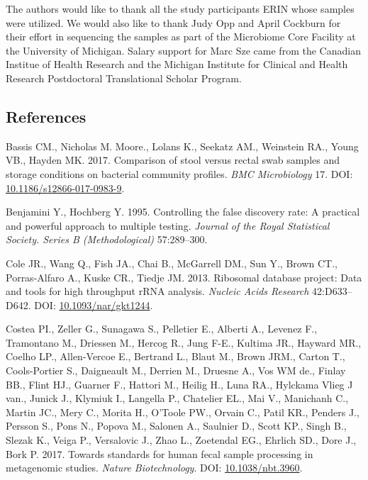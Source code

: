 \documentclass[12pt,]{article}
\begin{document}
The authors would like to thank all the study participants ERIN whose
samples were utilized. We would also like to thank Judy Opp and April
Cockburn for their effort in sequencing the samples as part of the
Microbiome Core Facility at the University of Michigan. Salary support
for Marc Sze came from the Canadian Institue of Health Research and the
Michigan Institute for Clinical and Health Research Postdoctoral
Translational Scholar Program.

\newpage

\subsection{References}\label{references}

\hypertarget{refs}{}
\hypertarget{ref-storage_Bassis_2017}{}
Bassis CM., Nicholas M. Moore., Lolans K., Seekatz AM., Weinstein RA.,
Young VB., Hayden MK. 2017. Comparison of stool versus rectal swab
samples and storage conditions on bacterial community profiles.
\emph{BMC Microbiology} 17. DOI:
\href{https://doi.org/10.1186/s12866-017-0983-9}{10.1186/s12866-017-0983-9}.

\hypertarget{ref-benjamini_controlling_1995}{}
Benjamini Y., Hochberg Y. 1995. Controlling the false discovery rate: A
practical and powerful approach to multiple testing. \emph{Journal of
the Royal Statistical Society. Series B (Methodological)} 57:289--300.

\hypertarget{ref-rdp_Cole_2013}{}
Cole JR., Wang Q., Fish JA., Chai B., McGarrell DM., Sun Y., Brown CT.,
Porras-Alfaro A., Kuske CR., Tiedje JM. 2013. Ribosomal database
project: Data and tools for high throughput rRNA analysis. \emph{Nucleic
Acids Research} 42:D633--D642. DOI:
\href{https://doi.org/10.1093/nar/gkt1244}{10.1093/nar/gkt1244}.

\hypertarget{ref-metagenomcis_bias_Costea_2017}{}
Costea PI., Zeller G., Sunagawa S., Pelletier E., Alberti A., Levenez
F., Tramontano M., Driessen M., Hercog R., Jung F-E., Kultima JR.,
Hayward MR., Coelho LP., Allen-Vercoe E., Bertrand L., Blaut M., Brown
JRM., Carton T., Cools-Portier S., Daigneault M., Derrien M., Druesne
A., Vos WM de., Finlay BB., Flint HJ., Guarner F., Hattori M., Heilig
H., Luna RA., Hylckama Vlieg J van., Junick J., Klymiuk I., Langella P.,
Chatelier EL., Mai V., Manichanh C., Martin JC., Mery C., Morita H.,
O'Toole PW., Orvain C., Patil KR., Penders J., Persson S., Pons N.,
Popova M., Salonen A., Saulnier D., Scott KP., Singh B., Slezak K.,
Veiga P., Versalovic J., Zhao L., Zoetendal EG., Ehrlich SD., Dore J.,
Bork P. 2017. Towards standards for human fecal sample processing in
metagenomic studies. \emph{Nature Biotechnology}. DOI:
\href{https://doi.org/10.1038/nbt.3960}{10.1038/nbt.3960}.
\end{document}
